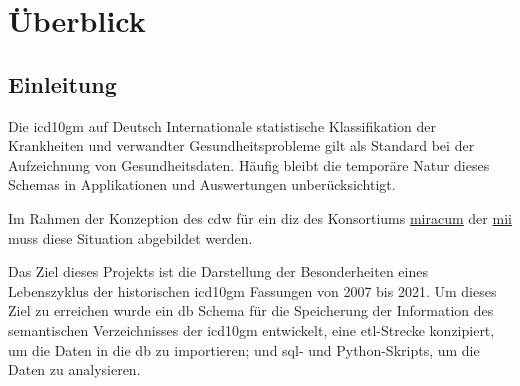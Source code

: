 \chapter{Überblick} \label{ch:introduction}

 \section{Einleitung} \label{sec:einl}

	Die \ac{icd10gm} auf Deutsch Internationale statistische Klassifikation der Krankheiten und  verwandter Gesundheitsprobleme gilt als Standard bei der Aufzeichnung von Gesundheitsdaten. Häufig bleibt die temporäre Natur dieses Schemas in Applikationen und Auswertungen unberücksichtigt.
	
	Im Rahmen der Konzeption des \ac{cdw} für ein  \ac{diz} des Konsortiums \href{https://www.miracum.org/}{\ac{miracum}} der \href{https://www.medizininformatik-initiative.de/de}{\ac{mii}} muss diese Situation abgebildet werden.
	
	Das Ziel dieses Projekts ist die Darstellung der Besonderheiten eines Lebenszyklus der historischen \ac{icd10gm} Fassungen von 2007 bis 2021. Um dieses Ziel zu erreichen wurde ein \ac{db} Schema für die Speicherung der Information des semantischen Verzeichnisses der \ac{icd10gm} entwickelt, eine \ac{etl}-Strecke konzipiert, um die Daten in die \ac{db} zu importieren; und \ac{sql}- und Python-Skripts, um die Daten zu analysieren.